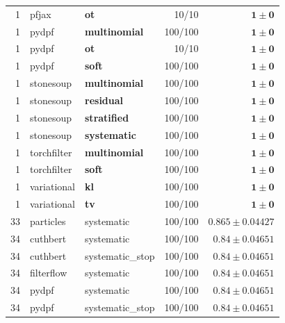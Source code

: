 \begin{table}[!htbp]
\begin{tabular}{rllrr}
1 & pfjax & \textbf{ot} & 10/10 & $\mathbf{1 \pm 0}$ \\
1 & pydpf & \textbf{multinomial} & 100/100 & $\mathbf{1 \pm 0}$ \\
1 & pydpf & \textbf{ot} & 10/10 & $\mathbf{1 \pm 0}$ \\
1 & pydpf & \textbf{soft} & 100/100 & $\mathbf{1 \pm 0}$ \\
1 & stonesoup & \textbf{multinomial} & 100/100 & $\mathbf{1 \pm 0}$ \\
1 & stonesoup & \textbf{residual} & 100/100 & $\mathbf{1 \pm 0}$ \\
1 & stonesoup & \textbf{stratified} & 100/100 & $\mathbf{1 \pm 0}$ \\
1 & stonesoup & \textbf{systematic} & 100/100 & $\mathbf{1 \pm 0}$ \\
1 & torchfilter & \textbf{multinomial} & 100/100 & $\mathbf{1 \pm 0}$ \\
1 & torchfilter & \textbf{soft} & 100/100 & $\mathbf{1 \pm 0}$ \\
1 & variational & \textbf{kl} & 100/100 & $\mathbf{1 \pm 0}$ \\
1 & variational & \textbf{tv} & 100/100 & $\mathbf{1 \pm 0}$ \\
33 & particles & systematic & 100/100 & $0.865 \pm 0.04427$ \\
34 & cuthbert & systematic & 100/100 & $0.84 \pm 0.04651$ \\
34 & cuthbert & systematic\_stop & 100/100 & $0.84 \pm 0.04651$ \\
34 & filterflow & systematic & 100/100 & $0.84 \pm 0.04651$ \\
34 & pydpf & systematic & 100/100 & $0.84 \pm 0.04651$ \\
34 & pydpf & systematic\_stop & 100/100 & $0.84 \pm 0.04651$ \\
\bottomrule
\end{tabular}
\end{table}

